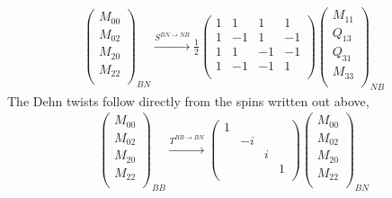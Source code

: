 \documentclass[12pt,a4paper]{article}
\newcounter{arrow}
\begin{document}
\begin{align}
\left( \begin{matrix}
M_{00}\\
M_{02}\\
M_{20}\\
M_{22}\\
\end{matrix} \right)_{BN}
\xrightarrow{S^{BN \rightarrow NB}}
\frac{1}{2} \left( \begin{matrix}
1&1&1&1\\
1&-1&1&-1\\
1&1&-1&-1\\
1&-1&-1&1\\
\end{matrix} \right)
\left( \begin{matrix}
M_{11}\\
Q_{13}\\
Q_{31}\\
M_{33}\\
\end{matrix} \right)_{NB}
\end{align}
The Dehn twists follow directly from the spins written out above,
\begin{align}
\left( \begin{matrix}
M_{00}\\
M_{02}\\
M_{20}\\
M_{22}\\
\end{matrix} \right)_{BB}
\xrightarrow{T^{BB \rightarrow BN}}
\left( \begin{matrix}
1&&&\\
&-i&&\\
&&i&\\
&&&1\\
\end{matrix} \right)
\left( \begin{matrix}
M_{00}\\
M_{02}\\
M_{20}\\
M_{22}\\
\end{matrix} \right)_{BN}
\end{align}
\end{document}
